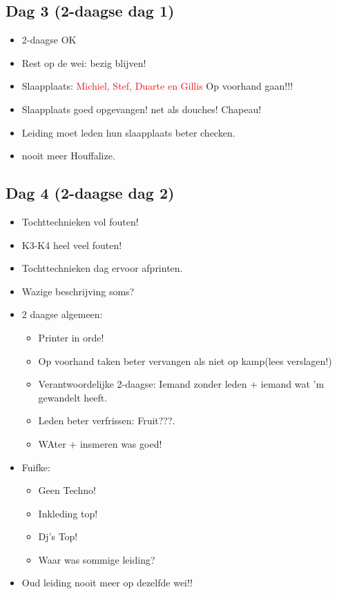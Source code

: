 \documentclass[pdftex,12pt,a4paper,english,titlepage]{article}
\begin{document}
\subsection{Dag 3 (2-daagse dag 1)}
\begin{itemize}
	\item 2-daagse OK
	\item Rest op de wei: bezig blijven!
	\item Slaapplaats: \textcolor{red}{Michiel, Stef, Duarte en Gillis} Op voorhand gaan!!!
	\item Slaapplaats goed opgevangen! net als douches! Chapeau!
	\item Leiding moet leden hun slaapplaats beter checken.
	\item nooit meer Houffalize.
\end{itemize}

\subsection{Dag 4 (2-daagse dag 2)}
\begin{itemize}
	\item Tochttechnieken vol fouten!
	\item K3-K4 heel veel fouten!
	\item Tochttechnieken dag ervoor afprinten.
	\item Wazige beschrijving soms?
	\item 2 daagse algemeen: 	\begin{itemize}
								\item Printer in orde!
								\item Op voorhand taken beter vervangen als niet op kamp(lees verslagen!)
								\item Verantwoordelijke 2-daagse: Iemand zonder leden + iemand wat 'm gewandelt heeft.
								\item Leden beter verfrissen: Fruit???.
								\item WAter + insmeren was goed!
								\end{itemize}
	\item Fuifke: \begin{itemize}
					\item Geen Techno!
					\item Inkleding top!
					\item Dj's Top!
					\item Waar was sommige leiding?
				\end{itemize}
	\item Oud leiding nooit meer op dezelfde wei!!
\end{itemize}
\end{document}
